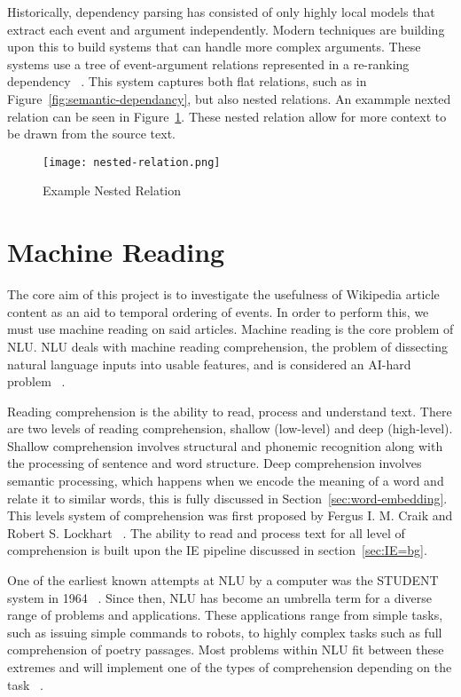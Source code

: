 \documentclass[bsc,frontabs,twoside,singlespacing,parskip,deptreport]{infthesis}     %
\begin{document}
Historically, dependency parsing has consisted of only highly local models that extract each event and argument independently.
Modern techniques are building upon this to build systems that can handle more complex arguments. These systems use a tree of
event-argument relations represented in a re-ranking dependency ~\cite{mcclosky2011event}.
This system captures both flat relations, such as in Figure~\ref{fig:semantic-dependancy}, but also nested relations.
An exammple nexted relation can be seen in Figure~\ref{fig:nested-relation}. These nested relation allow for more context to be drawn from
the source text.


\begin{figure}[H]
  \centering
  \texttt{[image: nested-relation.png]}
  \caption{Example Nested Relation}
  \label{fig:nested-relation}
\end{figure}


\section{Machine Reading}
The core aim of this project is to investigate the usefulness of Wikipedia article content as an aid to temporal ordering of events.
In order to perform this, we must use machine reading on said articles.
Machine reading is the core problem of NLU.
NLU deals with machine reading comprehension, the problem of dissecting natural language inputs into usable features,
and is considered an AI-hard problem ~\cite{}.

Reading comprehension is the ability to read, process and understand text.  
There are two levels of reading comprehension, shallow (low-level) and deep (high-level).
Shallow comprehension involves structural and phonemic recognition along with the processing of sentence and  word
structure.
Deep comprehension involves semantic processing, which happens when we encode the meaning of a word and relate it
to similar words, this is fully discussed in Section~\ref{sec:word-embedding}.
This levels system of comprehension was first proposed by  Fergus I. M. Craik and Robert S. Lockhart ~\cite{wagner2009beyond}.
The ability to read and process text for all level of comprehension is built upon the IE pipeline discussed in section~\ref{sec:IE=bg}.

One of the earliest known attempts at NLU by a computer was the STUDENT system in 1964 ~\cite{russell1995modern}.
Since then, NLU has become an
umbrella term for a diverse range of problems and applications. These applications range from simple tasks, such as
issuing simple commands to robots, to highly complex tasks such as full comprehension of poetry passages.
Most problems within NLU fit between these extremes and will implement one of the types of comprehension
depending on the task ~\cite{}.
\end{document}
